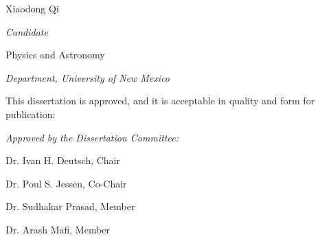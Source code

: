 \documentclass[letterpaper,10pt]{article}
\begin{document}
\vspace{0.8in}
\begin{Large}
 \noindent Xiaodong Qi 
 \vspace{-0.2in}
 \end{Large}

 \noindent\makebox[\linewidth][l]{\rule{2.8in}{1pt}}
  \textit{Candidate} \vspace{0.5in}
 
 \begin{Large}
 \noindent Physics and Astronomy
 \vspace{-0.2in}
 \end{Large}
 
  \noindent\makebox[\linewidth][l]{\rule{2.8in}{1pt}} 
    \textit{Department, University of New Mexico} \vspace{0.2in}


 
 
   \noindent This dissertation is approved, and it is acceptable in quality and form for publication: \vspace{0.2in}
\begin{large}
 \noindent \textit{Approved by the Dissertation Committee:} \vspace{0.45in}
 \end{large}
 
%  
%  
%  

 

 \noindent\makebox[\linewidth]{\rule{5.5in}{1pt}}
 
  \hfill Dr. Ivan H. Deutsch, Chair \vspace{0.35in}
 
 
 
 \noindent\makebox[\linewidth]{\rule{5.5in}{1pt}}
 
   \hfill Dr. Poul S. Jessen, Co-Chair  \vspace{0.35in}
  
  

  \noindent\makebox[\linewidth]{\rule{5.5in}{1pt}}
   
   \hfill Dr. Sudhakar Prasad, Member  \vspace{0.35in}
 
 
  \noindent\makebox[\linewidth]{\rule{5.5in}{1pt}}
    
    \hfill Dr. Arash Mafi, Member  \vspace{0.35in}
    
      

 
\end{document}
